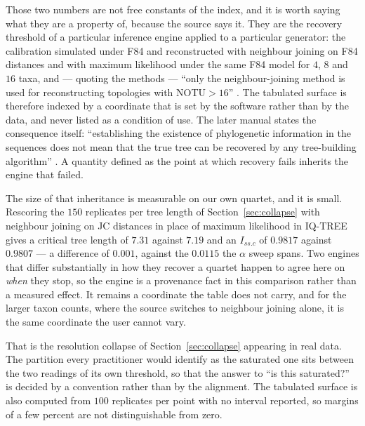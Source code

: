 \documentclass[11pt]{article}
\newcommand{\Issc}{I_{ss.c}}
\theoremstyle{definition}
\theoremstyle{remark}
\begin{document}
Those two numbers are not free constants of the index, and it is worth saying
what they are a property of, because the source says it. They are the
recovery threshold of a particular inference engine applied to a particular
generator: the calibration simulated under F84 and reconstructed with
neighbour joining on F84 distances and with maximum likelihood under the same
F84 model for $4$, $8$ and $16$ taxa, and --- quoting the methods --- ``only
the neighbour-joining method is used for reconstructing topologies with
NOTU${}>16$'' \citep{xia2003iss}. The tabulated surface is therefore indexed
by a coordinate that is set by the software rather than by the data, and
never listed as a condition of use. The later manual states the consequence
itself: ``establishing the existence of phylogenetic information in the
sequences does not mean that the true tree can be recovered by any
tree-building algorithm'' \citep{xia2009handbook}. A quantity defined as the
point at which recovery fails inherits the engine that failed.

The size of that inheritance is measurable on our own quartet, and it is
small. Rescoring the $150$ replicates per tree length of
Section~\ref{sec:collapse} with neighbour joining on JC distances in place of
maximum likelihood in IQ-TREE gives a critical tree length of $7.31$ against
$7.19$ and an $\Issc$ of $0.9817$ against $0.9807$ --- a difference of
$0.001$, against the $0.0115$ the $\alpha$ sweep spans. Two engines that
differ substantially in how they recover a quartet happen to agree here on
\emph{when} they stop, so the engine is a provenance fact in this comparison
rather than a measured effect. It remains a coordinate the table does not
carry, and for the larger taxon counts, where the source switches to neighbour
joining alone, it is the same coordinate the user cannot vary.

That is the resolution collapse of Section~\ref{sec:collapse} appearing in
real data. The partition every practitioner would identify as the saturated
one sits between the two readings of its own threshold, so that the answer to
``is this saturated?'' is decided by a convention rather than by the
alignment. The tabulated surface is also computed from $100$ replicates per
point with no interval reported, so margins of a few percent are not
distinguishable from zero.
\end{document}
